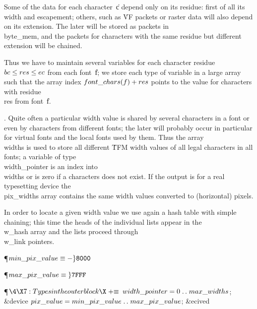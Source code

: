 Some of the data for each character~\|c depend only on its residue:
first of all its width and escapement; others, such as \.{VF} packets or
raster data will also depend on its extension. The later will be stored
as packets in \\{byte\_mem}, and the packets for characters with the same
residue but different extension will be chained.

Thus we have to maintain several variables for each character
residue~$\\{bc}\L\\{res}\L\\{ec}$ from each font~\|f; we store each type of
variable
in a large array such that the array index $\\{font\_chars}(\|f)+\\{res}$
points to
the value for characters with residue \\{res} from font~\|f.

\fi

. Quite often a particular width value is shared by several characters in
a font or even by characters from different fonts; the later will
probably occur in particular for virtual fonts and the local fonts used
by them. Thus the array \\{widths} is used to store all different \.{TFM}
width values of all legal characters in all fonts; a variable of type
\\{width\_pointer} is an index into \\{widths} or is zero if a characters does
not exist. If the output is for a real typesetting device the \\{pix\_widths}
array contains the same width values converted to (horizontal) pixels.

In order to locate a given width value we use again a hash
table with simple chaining; this time the heads of the individual lists
appear in the \\{w\_hash} array and the lists proceed through \\{w\_link}
pointers.

\Y\P\D {}$\\{min\_pix\_value}\S-\H{8000}$\par
\P\D {}$\\{max\_pix\_value}\S\H{7FFF}$\par
\Y\P$\4\X7:Types in the outer block\X\mathrel{+}\S$\6
$\\{width\_pointer}=0\to\\{max\_widths}$;\6
\&{device} $\\{pix\_value}=\\{min\_pix\_value}\to\\{max\_pix\_value}$;\6
\&{ecived}\par
\fi

